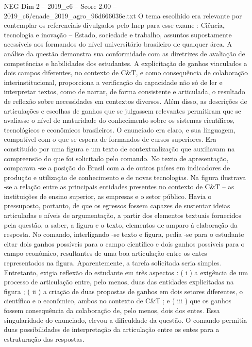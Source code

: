 \begin{textsample}{NEG Dim 2 – 2019\_c6 – Score 2.00 – 2019\_c6/enade\_2019\_agro\_96d666036e.txt}
O tema escolhido era relevante por contemplar os referenciais divulgados pelo Inep para esse exame : Ciência, tecnologia e inovação – Estado, sociedade e trabalho, assuntos supostamente acessíveis aos formandos do nível universitário brasileiro de qualquer área.
A análise da questão demonstra sua conformidade com as diretrizes de avaliação de competências e habilidades dos estudantes.
A explicitação de ganhos vinculados a dois campos diferentes, no contexto de C\&T, e como consequência de colaboração interinstitucional, proporciona a verificação da capacidade não só de ler e interpretar textos, como de narrar, de forma consistente e articulada, o resultado de reflexão sobre necessidades em contextos diversos.
Além disso, as descrições de articulações e escolhas de ganhos que se julgassem relevantes permitiram que se avaliasse o nível de maturidade do conhecimento sobre os sistemas científicos, tecnológicos e econômicos brasileiros.
O enunciado era claro, e sua linguagem, compatível com o que se espera de formandos de cursos superiores.
Era constituído por uma figura e um texto de contextualização que auxiliavam na compreensão do que foi solicitado pelo comando.
No texto de apresentação, comparava -se a posição do Brasil com a de outros países em indicadores de produção e utilização de conhecimento e de novas tecnologias.
Na figura ilustrava -se a relação entre as principais entidades presentes no contexto de C\&T – as instituições de ensino superior, as empresas e o setor público.
Havia o pressuposto, portanto, de que os egressos fossem capazes de sustentar ideias articuladas e níveis de argumentação, a partir dos elementos textuais fornecidos pela questão, a saber, a figura e o texto, elementos de amparo à elaboração da resposta.
No comando, interligando -se texto e figura, pedia -se para o estudante citar dois ganhos possíveis para o campo científico e dois ganhos possíveis para o campo econômico, resultantes de uma boa articulação entre os entes representados na figura.
Aparentemente, a tarefa solicitada seria simples.
Entretanto, exigia reflexão do estudante em três aspectos : ( i ) a exigência de um processo de articulação entre, pelo menos, duas das entidades explicitadas na figura ; ( ii ) a criação de duas propostas de ganhos em dois setores diferentes, o científico e o econômico, ambos no contexto de C\&T ; e ( iii ) que os ganhos fossem consequência da colaboração de, pelo menos, dois dos entes.
Essa singularidade do enunciado, elevou a dificuldade da questão.
O comando permitia duas possibilidades de interpretação da articulação entre os entes para a estruturação das respostas.

\end{textsample}
